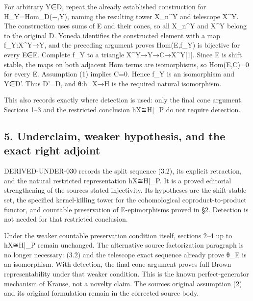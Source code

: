 \documentclass[11pt]{article}
\begin{document}
For arbitrary Y\allowbreak{}∈D,\allowbreak{} repeat the already established construction for H\_\allowbreak{}Y\allowbreak{}=Hom\_\allowbreak{}D(−,\allowbreak{}Y)\allowbreak{},\allowbreak{} naming the resulting tower X\_\allowbreak{}n\textasciicircum{}Y and telescope X\^{}Y. The construction uses sums of E and their cones,\allowbreak{} so all X\_\allowbreak{}n\textasciicircum{}Y and X\^{}Y belong to the original D\textquotesingle. Yoneda identifies the constructed element with a map f\_\allowbreak{}Y:\allowbreak{}X\textasciicircum{}Y\allowbreak{}→Y,\allowbreak{} and the preceding argument proves Hom(E,\allowbreak{}f\_\allowbreak{}Y)\allowbreak{} is bijective for every E\allowbreak{}∈E. Complete f\_\allowbreak{}Y to a triangle X\textasciicircum{}Y\allowbreak{}→Y\allowbreak{}→C\allowbreak{}→X\textasciicircum{}Y[1]\allowbreak{}. Since E is shift stable,\allowbreak{} the maps on both adjacent Hom terms are isomorphisms,\allowbreak{} so Hom(E,\allowbreak{}C)\allowbreak{}\allowbreak{}=0 for every E. Assumption (1)\allowbreak{} implies C\allowbreak{}=0. Hence f\_\allowbreak{}Y is an isomorphism and Y\allowbreak{}∈D'. Thus D'\allowbreak{}=D,\allowbreak{} and θ:\allowbreak{}h\_\allowbreak{}X\allowbreak{}→H is the required natural isomorphism.

This also records exactly where detection is used:\allowbreak{} only the final cone argument. Sections 1–\allowbreak{}3 and the restricted conclusion hX≅H|\_\allowbreak{}P do not require detection.

\subsection{\texorpdfstring{5. Underclaim,\allowbreak{} weaker hypothesis,\allowbreak{} and the exact right adjoint}{5.  weaker  and the exact right adjoint}}\label{proofs-11460-11655-underclaim-weaker-hypothesis-and-the-exact-right-adjoint}

DERIVED-UNDER-030 records the split sequence (3.2)\allowbreak{},\allowbreak{} its explicit retraction,\allowbreak{} and the natural restricted representation hX≅H|\_\allowbreak{}P. It is a proved editorial strengthening of the source\textquotesingle s stated injectivity. Its hypotheses are the shift-stable set,\allowbreak{} the specified kernel-killing tower for the cohomological coproduct-to-product functor,\allowbreak{} and countable preservation of E-epimorphisms proved in §2. Detection is not needed for that restricted conclusion.

Under the weaker countable preservation condition itself,\allowbreak{} sections 2–\allowbreak{}4 up to hX≅H|\_\allowbreak{}P remain unchanged. The alternative source factorization paragraph is no longer necessary:\allowbreak{} (3.2)\allowbreak{} and the telescope exact sequence already prove θ\_\allowbreak{}E is an isomorphism. With detection,\allowbreak{} the final cone argument proves full Brown representability under that weaker condition. This is the known perfect-generator mechanism of Krause,\allowbreak{} not a novelty claim. The source\textquotesingle s original assumption (2)\allowbreak{} and its original formulation remain in the corrected source body.
\end{document}
